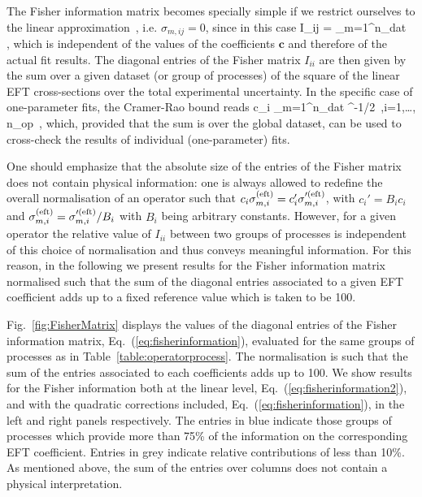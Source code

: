 The Fisher information matrix becomes specially simple if we restrict
 ourselves to the linear approximation~\cite{Ellis:2018gqa}, i.e. $\sigma_{m,ij}=0$, since in this case
\be
\label{eq:fisherinformation2}
I_{ij} = \sum_{m=1}^{n_{\rm dat}}  \, ,
\ee
which is independent of the values of the coefficients $\boldsymbol{c}$
and therefore of the actual fit results.
%
The diagonal entries of the Fisher matrix $I_{ii}$ are then given by the
sum over a given dataset (or group of processes) of the square of
the linear
EFT cross-sections over the total experimental uncertainty.
%
In the specific case of one-parameter fits, the Cramer-Rao bound reads
\be
\label{cramerraobound}
\delta c_i  \ge \lp \sum_{m=1}^{n_{\rm dat}}    \rp ^{-1/2} \,,\qquad  i=1,\ldots, n_{\rm op}\, ,
\ee
which, provided that the sum is over the global dataset, can be used to cross-check
the results of individual (one-parameter) fits.

One should emphasize that the absolute size of the entries of the Fisher matrix does not
contain physical information: one is always allowed to redefine the overall normalisation
of an operator such that $c_i\sigma^{(\rm eft)}_{m,i} = c_i'\sigma'^{(\rm eft)}_{m,i}$, with
$c_i' = B_i c_i$ and $\sigma^{(\rm eft)}_{m,i} =\sigma'^{(\rm eft)}_{m,i}/B_i$
with $B_i$ being arbitrary constants.
%
However, for a given operator the relative value of $I_{ii}$ between two groups of processes is independent
of this choice of normalisation and
thus conveys meaningful information.
%
For this reason, in the following we present results for the Fisher information matrix normalised
such that 
the sum of the diagonal entries associated to a given EFT coefficient adds up to a fixed reference value
which is taken to be 100.

Fig.~\ref{fig:FisherMatrix} displays the values of the diagonal entries of the Fisher
information matrix, Eq.~(\ref{eq:fisherinformation}), evaluated for
the same groups of processes as in Table~\ref{table:operatorprocess}.
%
The normalisation is such that the sum of the entries associated to each coefficients
adds up to 100.
%
We show results for the Fisher information both at the linear level, Eq.~(\ref{eq:fisherinformation2}),
and with the quadratic corrections included, Eq.~(\ref{eq:fisherinformation}),
in the left and right panels respectively.
%
The entries in blue indicate those groups of processes
which provide more than 75\% of the information on the corresponding
EFT coefficient.
%
Entries in grey indicate relative contributions
of less than 10\%.
%
As mentioned above, the sum of the entries over columns does not contain a physical
      interpretation.
  
